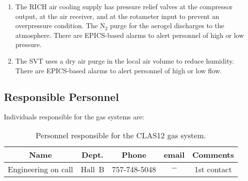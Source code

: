 \begin{enumerate}
\item The RICH air cooling supply has pressure relief valves at the compressor output, at the 
air receiver, and at the rotameter input to prevent an overpressure condition. The N$_2$ purge 
for the aerogel discharges to the atmosphere. There are EPICS-based alarms to alert personnel 
of high or low pressure.

\item The SVT uses a dry air purge in the local air volume to reduce humidity. There are 
EPICS-based alarms to alert personnel of high or low flow.
\end{enumerate}

\subsection{Responsible Personnel}

Individuals responsible for the gas systems are:

\begin{table}[!htb]
\centering
\begin{tabular}{|c|c|c|c|c|} \hline
Name&Dept.&Phone&email&Comments \\ \hline
Engineering on call&Hall~B&757-748-5048&$-$& 1st contact \\ \hline
\end{tabular}
\caption{Personnel responsible for the CLAS12 gas system.} 
\label{tb:gas}
\end{table}


